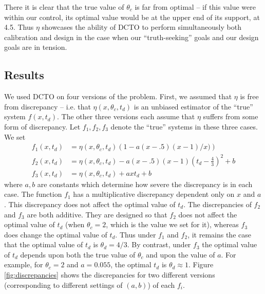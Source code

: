 \documentclass[12pt]{article}
\begin{document}
%
There it is clear that the true value of $\theta_c$ is far from optimal -- if this value were within our control, its optimal value would be at the upper end of its support, at 4.5.
%
Thus $\eta$ showcases the ability of DCTO to perform simultaneously both calibration and design in the case when our ``truth-seeking'' goals and our design goals are in tension.
%

%
\subsection{Results}
% 
We used DCTO on four versions of the problem.
%
First, we assumed that $\eta$ is free from discrepancy -- i.e. that $\eta(x,\theta_c,t_d)$ is an unbiased estimator of the ``true'' system $f(x,t_d)$.
%
The other three versions each assume that $\eta$ suffers from some form of discrepancy.
%
Let $f_1,f_2,f_3$ denote the ``true'' systems in these three cases.
%
We set 
\begin{align*}
f_1(x,t_d) &= \eta(x,\theta_c,t_d) \left(1-a(x-.5)(x-1)/x) \right) \\
f_2(x,t_d)&= \eta(x,\theta_c,t_d) - a(x-.5)(x-1)\left(t_d-\frac43\right)^2 + b\\
f_3(x,t_d)&=\eta(x,\theta_c,t_d) + axt_d+b
\end{align*}
%
where $a,b$ are constants which determine how severe the discrepancy is in each case. 
%
The function $f_1$ has a multiplicative discrepancy dependent only on $x$ and $a$. 
%
This discrepancy does not affect the optimal value of $t_d$.  
%
The discrepancies of $f_2$ and $f_3$ are both additive.
%
They are designed so that $f_2$ does not affect the optimal value of $t_d$ (when $\theta_c=2$, which is the value we set for it), whereas $f_3$ does change the optimal value of $t_d$.
%
Thus under $f_1$ and $f_2$, it remains the case that the optimal value of $t_d$ is $\theta_d=4/3$. 
%
By contrast, under $f_3$ the optimal value of $t_d$ depends upon both the true value of $\theta_c$ and upon the value of $a$. 
%
For example, for $\theta_c=2$ and $a=0.055$, the optimal $t_d$ is $\theta_d\approx1$.
%
Figure \ref{fig:discrepancies} shows the discrepancies for two different versions (corresponding to different settings of $(a,b)$) of each $f_i$.
%
\end{document}
